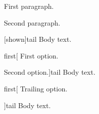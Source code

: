 
\begin{sample}{First paragraph.

    Second paragraph.}[shown]{tail}
  Body text.
\end{sample}

\begin{sample}{first}[
    First option.

    Second option.]{tail}
  Body text.
\end{sample}

\begin{sample}{first}[
    Trailing option.

  ]{tail}
  Body text.
\end{sample}
